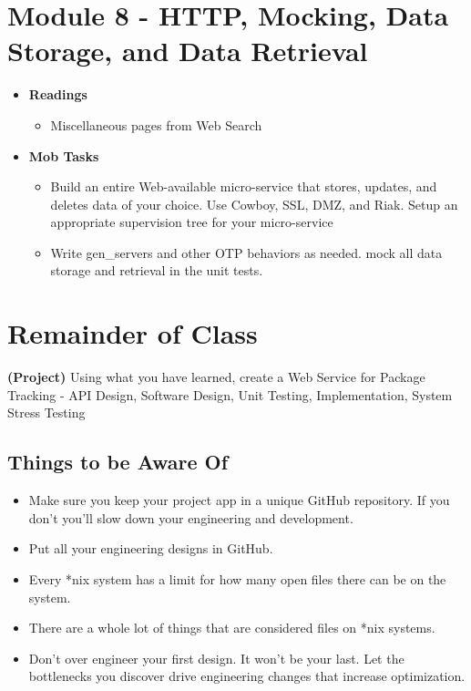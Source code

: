 \documentclass[12pt]{amsart}
\begin{document}
	\section*{Module 8 - HTTP, Mocking, Data Storage, and Data Retrieval}  
	\begin{itemize}
		\item \textbf{Readings}
		\begin{itemize}
			\item Miscellaneous pages from Web Search
		\end{itemize}
	\end{itemize}
	\begin{itemize}
		\item \textbf{Mob Tasks}
		\begin{itemize}
		\item Build an entire Web-available micro-service that stores, updates, and deletes data of your choice. Use Cowboy, SSL, DMZ, and Riak. Setup an appropriate supervision tree for your micro-service
		\item Write gen\_servers and other OTP behaviors as needed. mock all data storage and retrieval in the unit tests.
		\end{itemize}
	\end{itemize}

	\section*{Remainder of Class} \textbf{(Project)} Using what you have learned, create a Web Service for Package Tracking - API Design, Software Design, Unit Testing, Implementation, System Stress Testing
	\subsection{Things to be Aware Of}
	\begin{itemize}
		\item Make sure you keep your project app in a unique GitHub repository. If you don't you'll slow down your engineering and development.
		\item Put all your engineering designs in GitHub.
		\item Every *nix system has a limit for how many open files there can be on the system.
		\item There are a whole lot of things that are considered files on *nix systems.
		\item Don't over engineer your first design. It won't be your last. Let the bottlenecks you discover drive engineering changes that increase optimization.
	\end{itemize}
\end{document}
